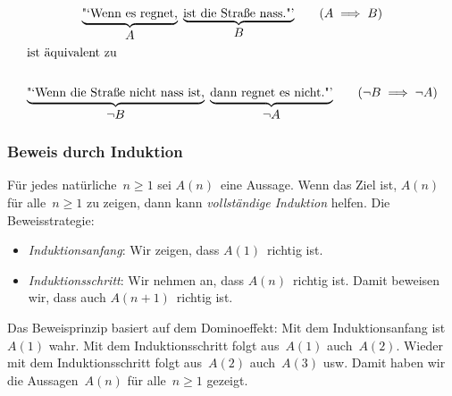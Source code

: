 \documentclass[a4paper]{article}
\begin{document}
\begin{example}
    \begin{gather*}
        \underbrace{\text{"`Wenn es regnet,}}_{\displaystyle A}\; \underbrace{\text{ist die Straße nass."'}}_{\displaystyle B} \qquad (A \implies B) \\
        \shortintertext{ist äquivalent zu} \\
        \underbrace{\text{"`Wenn die Straße nicht nass ist,}}_{\displaystyle\neg B}\; \underbrace{\text{dann regnet es nicht."'}}_{\displaystyle\neg A} \qquad (\neg B \implies \neg A)
    \end{gather*}
\end{example}

\subsubsection{Beweis durch Induktion}

Für jedes natürliche~$n \geq 1$ sei $A(n)$~eine Aussage. Wenn das Ziel ist, $A(n)$ für alle~$n \geq 1$ zu zeigen, dann kann \emph{vollständige Induktion} helfen. Die Beweisstrategie:
\begin{itemize}
    \item \emph{Induktionsanfang}: Wir zeigen, dass $A(1)$~richtig ist.
    \item \emph{Induktionsschritt}: Wir nehmen an, dass $A(n)$~richtig ist. Damit beweisen wir, dass auch $A(n+1)$~richtig ist.
\end{itemize}

Das Beweisprinzip basiert auf dem Dominoeffekt: Mit dem Induktionsanfang ist~$A(1)$ wahr. Mit dem Induktionsschritt folgt aus~$A(1)$ auch~$A(2)$. Wieder mit dem Induktionsschritt folgt aus~$A(2)$ auch~$A(3)$ usw. Damit haben wir die Aussagen~$A(n)$ für alle~$n \geq 1$ gezeigt.
\end{document}
